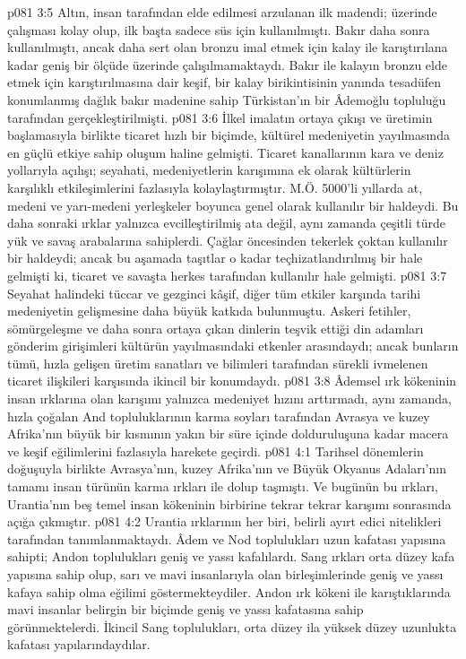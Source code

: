 \vs p081 3:5 Altın, insan tarafından elde edilmesi arzulanan ilk madendi; üzerinde çalışması kolay olup, ilk başta sadece süs için kullanılmıştı. Bakır daha sonra kullanılmıştı, ancak daha sert olan bronzu imal etmek için kalay ile karıştırılana kadar geniş bir ölçüde üzerinde çalışılmamaktaydı. Bakır ile kalayın bronzu elde etmek için karıştırılmasına dair keşif, bir kalay birikintisinin yanında tesadüfen konumlanmış dağlık bakır madenine sahip Türkistan’ın bir Âdemoğlu topluluğu tarafından gerçekleştirilmişti.
\vs p081 3:6 İlkel imalatın ortaya çıkışı ve üretimin başlamasıyla birlikte ticaret hızlı bir biçimde, kültürel medeniyetin yayılmasında en güçlü etkiye sahip oluşum haline gelmişti. Ticaret kanallarının kara ve deniz yollarıyla açılışı; seyahati, medeniyetlerin karışımına ek olarak kültürlerin karşılıklı etkileşimlerini fazlasıyla kolaylaştırmıştır. M.Ö. 5000’li yıllarda at, medeni ve yarı\hyp{}medeni yerleşkeler boyunca genel olarak kullanılır bir haldeydi. Bu daha sonraki ırklar yalnızca evcilleştirilmiş ata değil, aynı zamanda çeşitli türde yük ve savaş arabalarına sahiplerdi. Çağlar öncesinden tekerlek çoktan kullanılır bir haldeydi; ancak bu aşamada taşıtlar o kadar teçhizatlandırılmış bir hale gelmişti ki, ticaret ve savaşta herkes tarafından kullanılır hale gelmişti.
\vs p081 3:7 Seyahat halindeki tüccar ve gezginci kâşif, diğer tüm etkiler karşında tarihi medeniyetin gelişmesine daha büyük katkıda bulunmuştu. Askeri fetihler, sömürgeleşme ve daha sonra ortaya çıkan dinlerin teşvik ettiği din adamları gönderim girişimleri kültürün yayılmasındaki etkenler arasındaydı; ancak bunların tümü, hızla gelişen üretim sanatları ve bilimleri tarafından sürekli ivmelenen ticaret ilişkileri karşısında ikincil bir konumdaydı.
\vs p081 3:8 Âdemsel ırk kökeninin insan ırklarına olan karışımı yalnızca medeniyet hızını arttırmadı, aynı zamanda, hızla çoğalan And topluluklarının karma soyları tarafından Avrasya ve kuzey Afrika’nın büyük bir kısmının yakın bir süre içinde dolduruluşuna kadar macera ve keşif eğilimlerini fazlasıyla harekete geçirdi.
\vs p081 4:1 Tarihsel dönemlerin doğuşuyla birlikte Avrasya’nın, kuzey Afrika’nın ve Büyük Okyanus Adaları’nın tamamı insan türünün karma ırkları ile dolup taşmıştı. Ve bugünün bu ırkları, Urantia’nın beş temel insan kökeninin birbirine tekrar tekrar karışımı sonrasında açığa çıkmıştır.
\vs p081 4:2 Urantia ırklarının her biri, belirli ayırt edici nitelikleri tarafından tanımlanmaktaydı. Âdem ve Nod toplulukları uzun kafatası yapısına sahipti; Andon toplulukları geniş ve yassı kafalılardı. Sang ırkları orta düzey kafa yapısına sahip olup, sarı ve mavi insanlarıyla olan birleşimlerinde geniş ve yassı kafaya sahip olma eğilimi göstermekteydiler. Andon ırk kökeni ile karıştıklarında mavi insanlar belirgin bir biçimde geniş ve yassı kafatasına sahip görünmektelerdi. İkincil Sang toplulukları, orta düzey ila yüksek düzey uzunlukta kafatası yapılarındaydılar.
